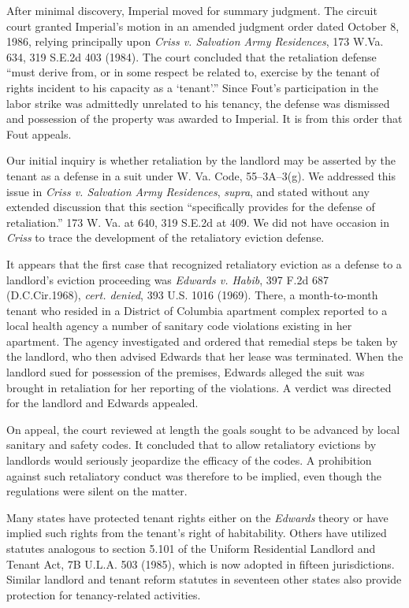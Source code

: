 After minimal discovery, Imperial moved for summary judgment. The circuit court
granted Imperial's motion in an amended judgment order dated October 8, 1986,
relying principally upon \textit{Criss v. Salvation Army Residences}, 173 W.Va.
634, 319 S.E.2d 403 (1984). The court concluded that the retaliation defense
``must derive from, or in some respect be related to, exercise by the tenant of
rights incident to his capacity as a `tenant'.'' Since Fout's participation in
the labor strike was admittedly unrelated to his tenancy, the defense was
dismissed and possession of the property was awarded to Imperial. It is from
this order that Fout appeals.

Our initial inquiry is whether retaliation by the landlord may be asserted by
the tenant as a defense in a suit under W. Va. Code, 55--3A--3(g). We addressed
this issue in \textit{Criss v. Salvation Army Residences}, \textit{supra}, and
stated without any extended discussion that this section ``specifically
provides for the defense of retaliation.'' 173 W. Va. at 640, 319 S.E.2d at 409.
We did not have occasion in \textit{Criss} to trace the development of the
retaliatory eviction defense.

It appears that the first case that recognized retaliatory eviction as a defense
to a landlord's eviction proceeding was \textit{Edwards v. Habib}, 397 F.2d 687
(D.C.Cir.1968), \textit{cert. denied}, 393 U.S. 1016
(1969). There, a month-to-month tenant who resided in a District of
Columbia apartment complex reported to a local health agency a number of
sanitary code violations existing in her apartment. The agency investigated and
ordered that remedial steps be taken by the landlord, who then advised Edwards
that her lease was terminated. When the landlord sued for possession of the
premises, Edwards alleged the suit was brought in retaliation for her reporting
of the violations. A verdict was directed for the landlord and Edwards
appealed.

On appeal, the court reviewed at length the goals sought to be advanced by local
sanitary and safety codes. It concluded that to allow retaliatory evictions by
landlords would seriously jeopardize the efficacy of the codes. A prohibition
against such retaliatory conduct was therefore to be implied, even though the
regulations were silent on the matter.

Many states have protected tenant rights either on the \textit{Edwards} theory
or have implied such rights from the tenant's right of habitability. Others
have utilized statutes analogous to section 5.101 of the Uniform Residential
Landlord and Tenant Act, 7B U.L.A. 503 (1985), which is now adopted in fifteen
jurisdictions. Similar landlord and tenant reform statutes in seventeen other
states also provide protection for tenancy-related activities.

